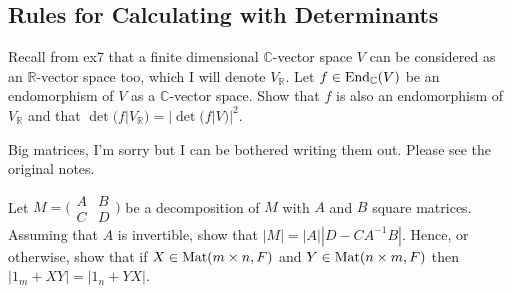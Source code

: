 \subsection{Rules for Calculating with Determinants}
\item Recall from ex7 that a finite dimensional $\mathbb{C}$-vector space $V$ can be considered as an $\mathbb{R}$-vector space too, which I will denote $V_{\mathbb{R}}$. Let $f \in \text{End}_{\mathbb{C}}(V)$ be an endomorphism of $V$ as a $\mathbb{C}$-vector space. Show that $f$ is also an endomorphism of $V_{\mathbb{R}}$ and that $\det(f|V_{\mathbb{R}}) = |\det(f|V)|^2$.
\item Big matrices, I'm sorry but I can be bothered writing them out. Please see the original notes.
  
\item Let $M = \bigl( \begin{smallmatrix} A & B \\ C & D \end{smallmatrix} \bigr)$ be a decomposition of $M$ with $A$ and $B$ square matrices. Assuming that $A$ is invertible, show that $|M| = |A||D-CA^{-1}B|$. Hence, or otherwise, show that if $X \in \text{Mat}(m \times n, F)$ and $Y \in \text{Mat}(n \times m, F)$ then $|1_m + XY| = |1_n + YX|$.